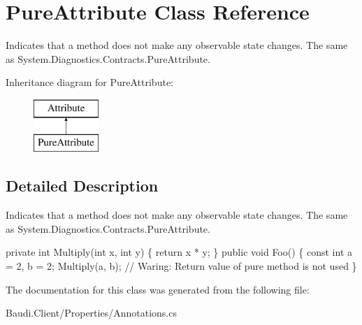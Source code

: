 \hypertarget{class_pure_attribute}{}\section{Pure\+Attribute Class Reference}
\label{class_pure_attribute}


Indicates that a method does not make any observable state changes. The same as {\ttfamily System.\+Diagnostics.\+Contracts.\+Pure\+Attribute}.  


Inheritance diagram for Pure\+Attribute\+:\begin{figure}[H]
\begin{center}
\leavevmode
\includegraphics[height=2.000000cm]{class_pure_attribute}
\end{center}
\end{figure}


\subsection{Detailed Description}
Indicates that a method does not make any observable state changes. The same as {\ttfamily System.\+Diagnostics.\+Contracts.\+Pure\+Attribute}. 


\begin{DoxyCode}
[Pure] \textcolor{keyword}{private} \textcolor{keywordtype}{int} Multiply(\textcolor{keywordtype}{int} x, \textcolor{keywordtype}{int} y) \{ \textcolor{keywordflow}{return} x * y; \}
\textcolor{keyword}{public} \textcolor{keywordtype}{void} Foo() \{
  \textcolor{keyword}{const} \textcolor{keywordtype}{int} a = 2, b = 2;
  Multiply(a, b); \textcolor{comment}{// Waring: Return value of pure method is not used}
\}
\end{DoxyCode}


The documentation for this class was generated from the following file\+:\begin{DoxyCompactItemize}
\item 
Baudi.\+Client/\+Properties/Annotations.\+cs\end{DoxyCompactItemize}
